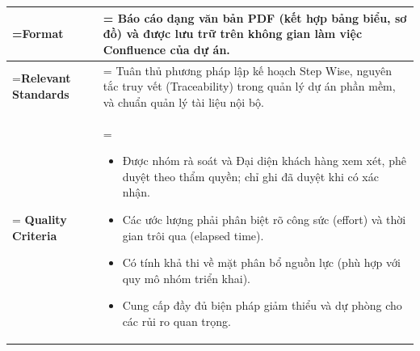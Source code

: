 \begin{table}[H]
\begin{tabularx}{\textwidth}{|>{\hsize=0.5\hsize\linewidth=\hsize\bfseries}X|>{\hsize=1.5\hsize\linewidth=\hsize}X|}
        \hline
        Format & Báo cáo dạng văn bản PDF (kết hợp bảng biểu, sơ đồ) và được lưu trữ trên không gian làm việc Confluence của dự án. \\
        \hline
        Relevant Standards & Tuân thủ phương pháp lập kế hoạch Step Wise, nguyên tắc truy vết (Traceability) trong quản lý dự án phần mềm, và chuẩn quản lý tài liệu nội bộ. \\
        \hline
        Quality Criteria & 
        \vspace{-0.8em}
        \begin{itemize}[leftmargin=*, nosep]
            \item Được nhóm rà soát và Đại diện khách hàng xem xét, phê duyệt theo thẩm quyền; chỉ ghi đã duyệt khi có xác nhận.
            \item Các ước lượng phải phân biệt rõ công sức (effort) và thời gian trôi qua (elapsed time).
            \item Có tính khả thi về mặt phân bổ nguồn lực (phù hợp với quy mô nhóm triển khai).
            \item Cung cấp đầy đủ biện pháp giảm thiểu và dự phòng cho các rủi ro quan trọng.
        \end{itemize}
        \vspace{-1em} \\
        \hline
    \end{tabularx}
\end{table}

